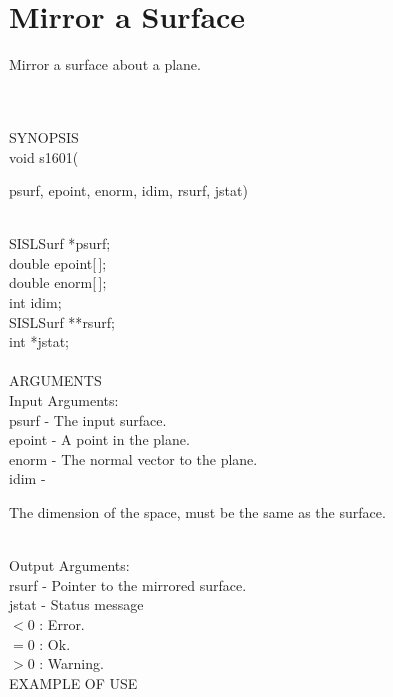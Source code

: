 \section{Mirror a Surface}
\begin{minipg1}
  Mirror a surface about a plane.
\end{minipg1} \\ \\
SYNOPSIS\\
        \>void s1601(\begin{minipg3}
          {\fov psurf}, {\fov epoint}, {\fov enorm}, {\fov idim}, {\fov rsurf}, {\fov jstat})
        \end{minipg3}\\[0.3ex]
        \>\>    SISLSurf \> *{\fov psurf};\\
        \>\>    double   \> {\fov epoint}[\,];\\
        \>\>    double   \> {\fov enorm}[\,];\\
        \>\>    int      \> {\fov idim};\\
        \>\>    SISLSurf \> **{\fov rsurf};\\
        \>\>    int      \> *{\fov jstat};\\
\\
ARGUMENTS\\
        \>Input Arguments:\\
        \>\>    {\fov psurf} \> - \> The input surface.\\
        \>\>    {\fov epoint}\> - \> A point in the plane.\\
        \>\>    {\fov enorm} \> - \> The normal vector to the plane.\\
        \>\>    {\fov idim}  \> - \>
        \begin{minipg2}
          The dimension of the space, must be the same as the surface.
        \end{minipg2}\\[0.8ex]
        \>Output Arguments:\\
        \>\>    {\fov rsurf} \> - \> Pointer to the mirrored surface.\\
        \>\>    {\fov jstat} \> - \> Status message\\
                \>\>\>\>\> $< 0$ : Error.\\
                \>\>\>\>\> $= 0$ : Ok.\\
                \>\>\>\>\> $> 0$ : Warning.\\
EXAMPLE OF USE\\
